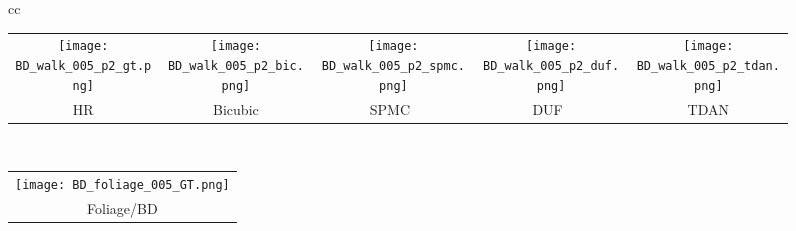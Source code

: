 \documentclass[10pt,twocolumn,letterpaper]{article}
\newcommand{\widthscalefive}{0.125}
\begin{document}
\begin{figure*}
\begin{tabular}{cc}
\begin{adjustbox}{valign=t}
\begin{tabular}{ccccc}
				\\
				\texttt{[image: BD\_walk\_005\_p2\_gt.png]} \hspace{-1.5mm} &
				\texttt{[image: BD\_walk\_005\_p2\_bic.png]} \hspace{-1.5mm} &
				\texttt{[image: BD\_walk\_005\_p2\_spmc.png]} \hspace{-1.5mm} &
				\texttt{[image: BD\_walk\_005\_p2\_duf.png]}\hspace{-1.5mm} &
				\texttt{[image: BD\_walk\_005\_p2\_tdan.png]}
				\\
				HR \hspace{-1.5mm} &
				Bicubic \hspace{-1.5mm} &
				SPMC~\cite{tao2017detail} \hspace{-1.5mm} &
				DUF~\cite{jo2018deep}\hspace{-1.5mm} &
				TDAN
				\\
			\end{tabular}
			\end{adjustbox}

         \\
          \begin{adjustbox}{valign=t}
\begin{tabular}{c}
				\texttt{[image: BD\_foliage\_005\_GT.png]}
				\\
				Foliage/BD
			

\end{tabular}
\end{adjustbox}
\end{tabular}
\end{figure*}
\end{document}
